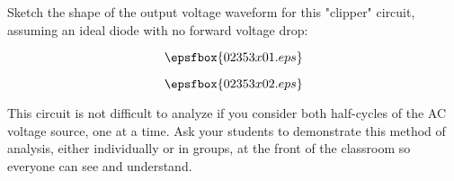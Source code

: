 

Sketch the shape of the output voltage waveform for this "clipper" circuit, assuming an ideal diode with no forward voltage drop:

$$\epsfbox{02353x01.eps}$$







$$\epsfbox{02353x02.eps}$$







This circuit is not difficult to analyze if you consider both half-cycles of the AC voltage source, one at a time.  Ask your students to demonstrate this method of analysis, either individually or in groups, at the front of the classroom so everyone can see and understand.




